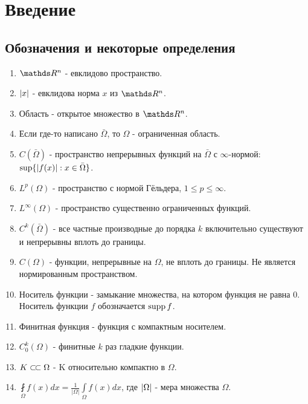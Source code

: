 \chapter*{Введение}
\section*{Обозначения и некоторые определения}
\begin{enumerate}
\item $\real^n$ - евклидово пространство.
\item $\lvert x\rvert$ - евклидова норма $x$ из $\real^n$.
\item Область - открытое множество в $\real^n$.
\item Если где-то написано $\bar{\Omega}$, то $\Omega$ - ограниченная область.
\item $C(\bar{\Omega})$ - пространство непрерывных функций на $\bar{\Omega}$ с $\infty$-нормой: $\sup \{ \lvert f(x)\rvert : x \in \bar{\Omega} \}$.
\item $L^p (\Omega)$ - пространство с нормой Гёльдера, $1 \leq p \leq \infty$.
\item $L^\infty (\Omega)$ - пространство существенно ограниченных функций.
\item $C^k(\bar{\Omega})$ - все частные производные до порядка $k$ включительно существуют и непрерывны вплоть до границы.
\item $C(\Omega)$ - функции, непрерывные на $\Omega$, не вплоть до границы. Не является нормированным пространством.
\item Носитель функции - замыкание множества, на котором функция не равна $0$. Носитель функции $f$ обозначается $\operatorname{supp} f$.
\item Финитная функция - функция с компактным носителем.
\item $C^k_0(\Omega)$ - финитные $k$ раз гладкие функции.
\item $K \ssubset \Omega$ - K относительно компактно в $\Omega$.
\item $\displaystyle \fint \limits_{\Omega} f(x) dx = \frac{1}{|\Omega|} \int \limits_{\Omega} f(x) dx$, где $\lvert\Omega\rvert$ - мера множества $\Omega$.

\end{enumerate}

